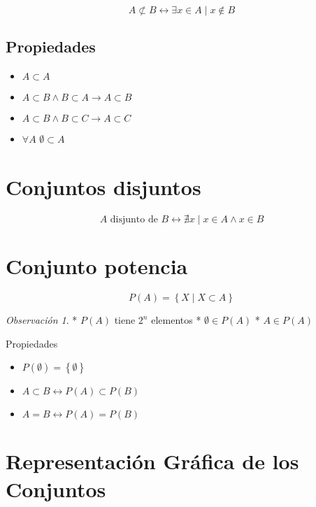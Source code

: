 \documentclass[
  16pt,
]{krantz}
\providecommand{\tightlist}{%
  \setlength{\itemsep}{0pt}\setlength{\parskip}{0pt}}
\theoremstyle{definition}
\theoremstyle{definition}
\theoremstyle{definition}
\theoremstyle{definition}
\theoremstyle{remark}
\newtheorem*{remark}{Observación}
\begin{document}
\[
A\not\subset B\leftrightarrow\exists x\in A\;|\; x\notin B
\]

\hypertarget{propiedades-1}{%
\subsection{Propiedades}\label{propiedades-1}}

\begin{itemize}
\tightlist
\item
  \(A\subset A\)
\item
  \(A\subset B\wedge B\subset A\rightarrow A\subset B\)
\item
  \(A\subset B\wedge B\subset C\rightarrow A\subset C\)
\item
  \(\forall A\) \(\emptyset\subset A\)
\end{itemize}

\hypertarget{conjuntos-disjuntos}{%
\section{Conjuntos disjuntos}\label{conjuntos-disjuntos}}

\[
A\text{ disjunto de } B\leftrightarrow\nexists x\;|\; x\in A\wedge x\in B  
\]

\hypertarget{conjunto-potencia}{%
\section{Conjunto potencia}\label{conjunto-potencia}}

\[
P(A)=\left\{X\;|\;X\subset A\right\}
\]

\begin{remark}
\iffalse{} {Observación. } \fi{}* \(P(A)\) tiene \(2^n\) elementos
* \(\emptyset\in P(A)\)
* \(A\in P(A)\)
\end{remark}

Propiedades

\begin{itemize}
\tightlist
\item
  \(P(\emptyset)=\left\{\emptyset\right\}\)
\item
  \(A\subset B\leftrightarrow P(A)\subset P(B)\)
\item
  \(A= B\leftrightarrow P(A)= P(B)\)
\end{itemize}

\hypertarget{representaciuxf3n-gruxe1fica-de-los-conjuntos}{%
\section{Representación Gráfica de los Conjuntos}\label{representaciuxf3n-gruxe1fica-de-los-conjuntos}}
\end{document}
